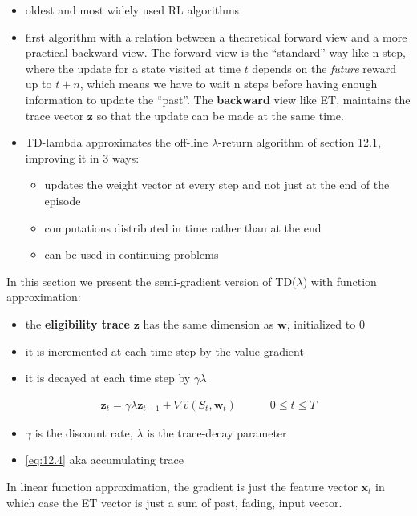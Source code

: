 \documentclass[sutton_barto_notes.tex]{subfiles}
\begin{document}
\begin{itemize}
\item oldest and most widely used RL algorithms 
\item first algorithm with a relation between a theoretical forward view and a more practical backward view. The forward view is the “standard” way like n-step, where the update for a state visited at time $t$ depends on the \textit{future} reward up to $t+n$, which means we have to wait n steps before having enough information to update the “past”. The \textbf{backward} view like ET, maintains the trace vector $\mathbf{z}$ so that the update can be made at the same time. 
\item TD-lambda approximates the off-line $\lambda$-return algorithm of section 12.1, improving it in 3 ways:
    \begin{itemize}
    \item updates the weight vector at every step and not just at the end of the episode 
    \item computations distributed in time rather than at the end 
    \item can be used in continuing problems 
    \end{itemize}
   
\end{itemize}

 In this section we present the semi-gradient version of TD($\lambda$) with function approximation: 
\begin{itemize}
\item the \textbf{eligibility trace} $\mathbf{z}$ has the same dimension as $\mathbf{w}$, initialized to $0$ 
\item it is incremented at each time step by the value gradient 
\item it is decayed at each time step by $\gamma \lambda$ 
\end{itemize}
\begin{align}\mathbf{z}_t = \gamma \lambda \mathbf{z}_{t-1} + \nabla \hat{v}(S_t, \mathbf{w}_t) \quad \quad \quad 0 \leq t \leq T \label{eq:12.4}\tag{12.4}
\end{align}
\begin{itemize}
\item $\gamma$ is the discount rate, $\lambda$ is the trace-decay parameter 
\item \ref{eq:12.4} aka accumulating trace
\end{itemize}

 In linear function approximation, the gradient is just the feature vector $\mathbf{x}_t$ in which case the ET vector is just a sum of past, fading, input vector. 
\end{document}
